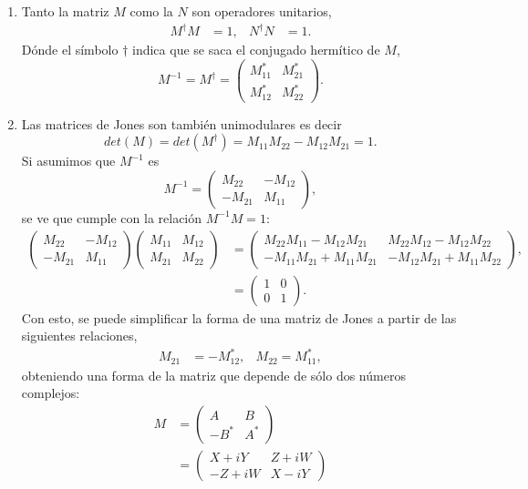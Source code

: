 \begin{enumerate}
\item Tanto la matriz $M$ como la $N$ son operadores unitarios,
  \begin{align*}
    M^{\dagger} M &= 1,& N^{\dagger}N &=1.
  \end{align*}
Dónde el símbolo $\dagger$ indica que se saca el conjugado hermítico
de $M$,
\begin{equation*}
M^{-1}=M^{\dagger}=
  \begin{pmatrix}
      M_{11}^*&M_{21}^*\\M_{12}^* & M_{22}^*
    \end{pmatrix}.
\end{equation*}
\item Las matrices de Jones son también unimodulares es decir
\begin{equation}det(M) = det(M^{\dagger})  = M_{11}M_{22}-M_{12}M_{21} = 1.\label{eq:unimodular}\end{equation} 
Si asumimos que $M^{-1}$ es
\begin{equation*}
  M^{-1}=
  \begin{pmatrix}
    M_{22}&-M_{12}\\-M_{21}&M_{11}
  \end{pmatrix},
\end{equation*}
se ve que cumple con la relación $M^{-1}M = 1$:
\begin{align*}
    \begin{pmatrix}
    M_{22}&-M_{12}\\-M_{21}&M_{11}
  \end{pmatrix}
\begin{pmatrix}
      M_{11}&M_{12}\\M_{21} & M_{22}
    \end{pmatrix}
&=
    \begin{pmatrix}
 M_{22}M_{11}-M_{12}M_{21}     & M_{22}M_{12}-M_{12}M_{22}\\
-M_{11}M_{21}+M_{11}M_{21}    & -M_{12}M_{21} + M_{11}M_{22} 
    \end{pmatrix},\\
&=
\begin{pmatrix}
  1 &0\\0&1
\end{pmatrix}.
\end{align*}
Con esto, se puede simplificar la forma de una matriz de Jones a
partir de las siguientes relaciones,
\begin{align*}
  M_{21} &= - M_{12}^*, & M_{22} = M_{11}^*,
\end{align*}
obteniendo una forma de la matriz que depende de sólo dos números
complejos:
\begin{align}
  M&=
  \begin{pmatrix}
    A & B \\-B^* & A^*
  \end{pmatrix}\\
&=
  \begin{pmatrix}
    X+iY & Z+iW \\-Z+iW& X-iY
  \end{pmatrix}
\label{eq:general_jones_matrix}
\end{align}


\end{enumerate}
